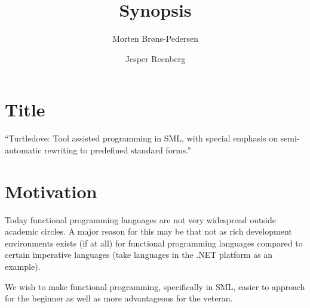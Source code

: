 \documentclass[a4paper,oneside]{article}
\author{Morten Brøns-Pedersen \and Jesper Reenberg}
\title{Synopsis}
\begin{document}
\maketitle






\section{Title}
``Turtledove: Tool assisted programming in SML, with special emphasis on semi-automatic rewriting to
predefined standard forms.''

\section{Motivation}
Today functional programming languages are not very widespread outside academic circles. A major
reason for this may be that not as rich development environments exists (if at all) for functional
programming languages compared to certain imperative languages (take languages in the .NET platform
as an example).

We wish to make functional programming, specifically in SML, easier to approach for the beginner as
well as more advantageous for the veteran.
\end{document}
